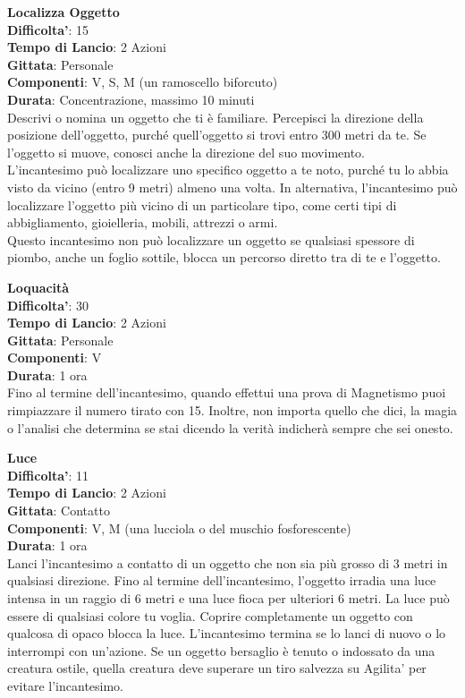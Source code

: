\begin{multicols}{2}
\medskip\textbf{Localizza Oggetto}\\
\textbf{Difficolta'}: 15\\
\textbf{Tempo di Lancio}: 2 Azioni\\
\textbf{Gittata}: Personale\\
\textbf{Componenti}: V, S, M (un ramoscello biforcuto)\\
\textbf{Durata}: Concentrazione, massimo 10 minuti \\
Descrivi o nomina un oggetto che ti è familiare. Percepisci la direzione della posizione dell’oggetto, purché quell’oggetto si trovi entro 300 metri da te. Se l’oggetto si muove, conosci anche la direzione del suo movimento.\\
L’incantesimo può localizzare uno specifico oggetto a te noto, purché tu lo abbia visto da vicino (entro 9 metri) almeno una volta. In alternativa, l’incantesimo può localizzare l’oggetto più vicino di un particolare tipo, come certi tipi di abbigliamento, gioielleria, mobili, attrezzi o armi.\\
Questo incantesimo non può localizzare un oggetto se qualsiasi spessore di piombo, anche un foglio sottile, blocca un percorso diretto tra di te e l’oggetto. 

\medskip\textbf{Loquacità}\\
\textbf{Difficolta'}: 30\\
\textbf{Tempo di Lancio}: 2 Azioni\\
\textbf{Gittata}: Personale\\
\textbf{Componenti}: V\\
\textbf{Durata}: 1 ora\\
Fino al termine dell’incantesimo, quando effettui una prova di Magnetismo puoi rimpiazzare il numero tirato con 15. Inoltre, non importa quello che dici, la magia o l'analisi che determina se stai dicendo la verità indicherà sempre che sei onesto.

\medskip\textbf{Luce}\\
\textbf{Difficolta'}: 11\\
\textbf{Tempo di Lancio}: 2 Azioni\\
\textbf{Gittata}: Contatto\\
\textbf{Componenti}: V, M (una lucciola o del muschio fosforescente)\\
\textbf{Durata}: 1 ora\\
Lanci l’incantesimo a contatto di un oggetto che non sia più grosso di 3 metri in qualsiasi direzione. Fino al termine dell’incantesimo, l’oggetto irradia una luce intensa in un raggio di 6 metri e una luce fioca per ulteriori 6 metri. La luce può essere di qualsiasi colore tu voglia. Coprire completamente un oggetto con qualcosa di opaco blocca la luce. L’incantesimo termina se lo lanci di nuovo o lo interrompi con un’azione. Se un oggetto bersaglio è tenuto o indossato da una creatura ostile, quella creatura deve superare un tiro salvezza su Agilita' per evitare l’incantesimo. 


\end{multicols}

